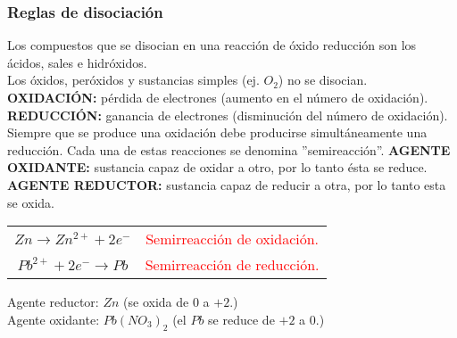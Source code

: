         \subsubsection{Reglas de disociación}
        \sangria{} Los compuestos que se disocian en una reacción de óxido reducción son los ácidos, sales e hidróxidos. \\
        \sangria{} Los óxidos, peróxidos y sustancias simples (ej. $O_2$) no se disocian. \\[10pt]
        \textbf{OXIDACIÓN:} pérdida de electrones (aumento en el número de oxidación).
        \textbf{REDUCCIÓN:} ganancia de electrones (disminución del número de oxidación).
        \sangria{} Siempre que se produce una oxidación debe producirse simultáneamente una reducción. Cada una de estas reacciones se denomina ''semireacción''.
         \saltoPag{}
        \textbf{AGENTE OXIDANTE:} sustancia capaz de oxidar a otro, por lo tanto ésta se reduce. \\
        \textbf{AGENTE REDUCTOR:} sustancia capaz de reducir a otra, por lo tanto esta se oxida.
        \begin{center}
            \begin{tabular}{cc}
                \multicolumn{1}{c}{$Zn \rightarrow Zn^{2+} + 2e^-$} &
                \multicolumn{1}{c}{\textcolor{red}{Semirreacción de oxidación.}} \\
                \multicolumn{1}{c}{$Pb^{2+} + 2e^- \rightarrow Pb$} &
                \multicolumn{1}{c}{\textcolor{red}{Semirreacción de reducción.}} \\
            \end{tabular}
        \end{center}
        Agente reductor: $Zn$ (se oxida de $0$ a $+2$.) \\
        Agente oxidante: $Pb(NO_3)_2$ (el $Pb$ se reduce de $+2$ a $0$.)
